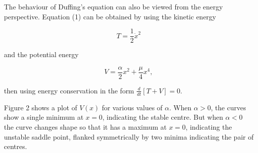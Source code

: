 
  The behaviour of Duffing's equation can also be viewed from the energy 
  perspective. Equation (1) can be obtained by using the kinetic energy 

  \begin{equation*}T=\dfrac{1}{2} \dot{x}^2 \tag{12}\end{equation*} 

  \noindent{}and the potential energy 

  \begin{equation*}V=\dfrac{\alpha}{2} x^2 + \dfrac{\mu}{4} x^4, 
  \tag{13}\end{equation*} 

  \noindent{}then using energy conservation in the form $\frac{d}{dt}[T+V]=0$. 

  Figure 2 shows a plot of $V(x)$ for various values of $\alpha$. When $\alpha 
  > 0$, the curves show a single minimum at $x=0$, indicating the stable 
  centre. But when $\alpha < 0$ the curve changes shape so that it has a 
  maximum at $x=0$, indicating the unstable saddle point, flanked symmetrically 
  by two minima indicating the pair of centres. 


